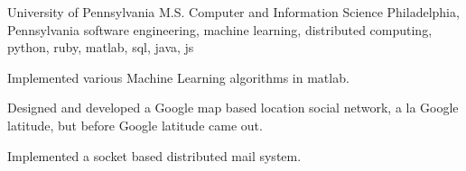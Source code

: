 \cventry
    {University of Pennsylvania} %
    {M.S. Computer and Information Science} %
    {Philadelphia, Pennsylvania} %
    {} %
    {software engineering, machine learning, distributed computing, python, ruby, matlab, sql, java, js} %
    {
        \vspace{-4.0mm}
        \begin{cvitems} %
        \item {Implemented various Machine Learning algorithms in matlab. }
        \item {Designed and developed a Google map based location social network, a la Google latitude, but before Google latitude came out.
        }
        \item {Implemented a socket based distributed mail system.}
        \end{cvitems}
    }
